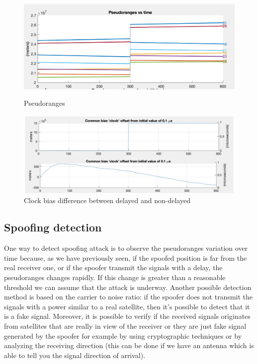 \vspace{2cm}
\begin{figure}[!htb]
\includegraphics[scale=0.2]{images/delay_figure_1.pdf}
\caption{Pseudoranges}
\label{fig:delay0_figure_1}
\includegraphics[scale=0.15]{images/delay_figure_5_comparison.pdf}
\caption{Clock bias difference between delayed and non-delayed}
\label{fig:delay0_figure_5_comparison}
\vspace{15pt}
\end{figure}
\vspace{-20pt}
\subsection{Spoofing detection}
\label{subsec:spoofing_detection}
One way to detect spoofing attack is to observe the pseudoranges variation over time because, as we have previously seen, if the spoofed position is far from the real receiver one, or if the spoofer transmit the signals with a delay, the pseudoranges changes rapidly. If this change is greater than a reasonable threshold we can assume that the attack is underway. Another possible detection method is based on the carrier to noise ratio: if the spoofer does not transmit the signals with a power similar to a real satellite, then it's possible to detect that it is a fake signal. Moreover, it is possible to verify if the received signals originates from satellites that are really in view of the receiver or they are just fake signal generated by the spoofer for example by using cryptographic techniques or by analyzing the receiving direction (this can be done if we have an antenna which is able to tell you the signal direction of arrival).